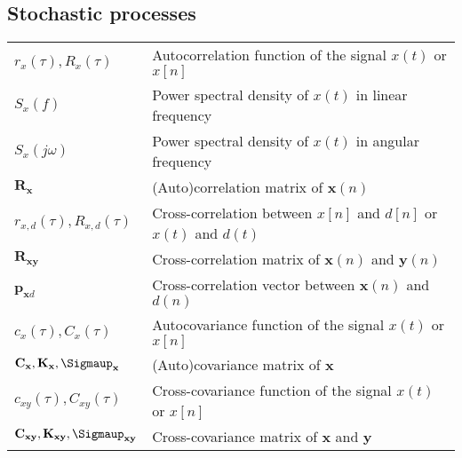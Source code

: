 \documentclass{article}
\begin{document}
\subsection{Stochastic processes}
\begin{xltabular}{\textwidth}{XX}
    \(r_x(\tau), R_x(\tau)\) & Autocorrelation function of the signal \(x(t)\) or \(x[n]\)\\
    \(S_x(f)\) & Power spectral density of \(x(t)\) in linear frequency\\
    \(S_x(j\omega)\) & Power spectral density of \(x(t)\) in angular frequency\\
    \(\mathbf{R}_\mathbf{x}\) & (Auto)correlation matrix of \(\mathbf{x}(n)\) \\
    \(r_{x,d}(\tau), R_{x,d}(\tau)\) & Cross-correlation between \(x[n]\) and \(d[n]\) or \(x(t)\) and \(d(t)\)\\
    \(\mathbf{R}_\mathbf{xy}\) & Cross-correlation matrix of \(\mathbf{x}(n)\) and \(\mathbf{y}(n)\)\\
    \(\mathbf{p}_{\mathbf{x}d}\)& Cross-correlation vector between \(\mathbf{x}(n)\) and \(d(n)\) \\
    \(c_x(\tau), C_x(\tau)\) & Autocovariance function of the signal \(x(t)\) or \(x[n]\)\\
    \(\mathbf{C}_\mathbf{x}, \mathbf{K}_\mathbf{x}, \boldsymbol{\Sigmaup}_\mathbf{x}\) & (Auto)covariance matrix of \(\mathbf{x}\) \\
    \(c_{xy}(\tau), C_{xy}(\tau)\) & Cross-covariance function of the signal \(x(t)\) or \(x[n]\)\\
    \(\mathbf{C}_{\mathbf{xy}}, \mathbf{K}_{\mathbf{xy}}, \boldsymbol{\Sigmaup}_{\mathbf{xy}}\) & Cross-covariance matrix of \(\mathbf{x}\) and \(\mathbf{y}\)
\end{xltabular}
\end{document}
